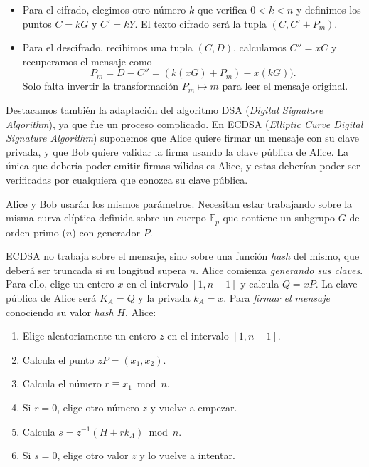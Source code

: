 \documentclass[
  a4paper,
  12pt,
  spanish,
]{scrartcl}
\begin{document}
\begin{itemize}
	\item Para el cifrado, elegimos otro número \(k\) que verifica $0 < k < n$ y definimos los puntos $C =kG$ y $C' = kY$. El texto cifrado será la tupla $(C, C' + P_m)$.
	\item Para el descifrado, recibimos una tupla $(C, D)$, calculamos $C'' = xC$ y recuperamos el mensaje como \[ P_m = D - C'' = (k(xG) + P_m) - x(kG)). \] Solo falta invertir la transformación $P_m \mapsto m$ para leer el mensaje original.
\end{itemize}



Destacamos también la adaptación del algoritmo DSA (\textit{Digital Signature Algorithm}), ya que fue un proceso complicado. En ECDSA (\textit{Elliptic Curve Digital Signature Algorithm}) suponemos que Alice quiere firmar un mensaje con su clave privada, y que Bob quiere validar la firma usando la clave pública de Alice. La única que debería poder emitir firmas válidas es Alice, y estas deberían poder ser verificadas por cualquiera que conozca su clave pública.

Alice y Bob usarán los mismos parámetros. Necesitan estar trabajando sobre la misma curva elíptica definida sobre un cuerpo $\mathbb{F}_p$ que contiene un subgrupo $G$ de orden primo ($n$) con generador $P$.

ECDSA no trabaja sobre el mensaje, sino sobre una función \textit{hash} del mismo, que deberá ser truncada si su longitud supera $n$. Alice comienza \textit{generando sus claves}. Para ello, elige un entero $x$ en el intervalo $[1,n-1]$ y calcula $Q=xP$. La clave pública de Alice será $K_A=Q$ y la privada $k_A=x$. Para \textit{firmar el mensaje} conociendo su valor \textit{hash} \(H\), Alice:

\begin{enumerate}
\item Elige aleatoriamente un entero $z$ en el intervalo $[1,n-1]$.
\item Calcula el punto $zP =(x_1,x_2)$.
\item Calcula el número $r \equiv x_1 \bmod n$.
\item Si $r=0$, elige otro número $z$ y vuelve a empezar.
\item Calcula $s=z^{-1}(H+rk_A)\bmod n$. \label{en:s}
\item Si $s=0$, elige otro valor $z$ y lo vuelve a intentar.
\end{enumerate}
\end{document}
